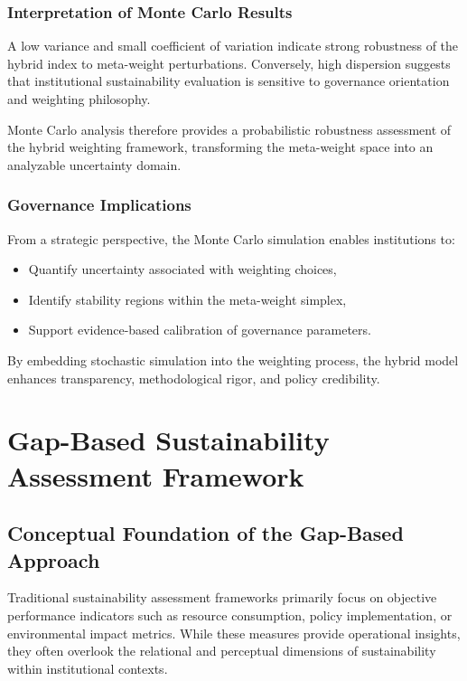\documentclass[11pt,a4paper]{article}
\begin{document}
\subsubsection{Interpretation of Monte Carlo Results}

A low variance and small coefficient of variation indicate strong robustness of the hybrid index to meta-weight perturbations. Conversely, high dispersion suggests that institutional sustainability evaluation is sensitive to governance orientation and weighting philosophy.

Monte Carlo analysis therefore provides a probabilistic robustness assessment of the hybrid weighting framework, transforming the meta-weight space into an analyzable uncertainty domain.

\subsubsection{Governance Implications}

From a strategic perspective, the Monte Carlo simulation enables institutions to:

\begin{itemize}
\item Quantify uncertainty associated with weighting choices,
\item Identify stability regions within the meta-weight simplex,
\item Support evidence-based calibration of governance parameters.
\end{itemize}

By embedding stochastic simulation into the weighting process, the hybrid model enhances transparency, methodological rigor, and policy credibility.


\section{Gap-Based Sustainability Assessment Framework}

\subsection{Conceptual Foundation of the Gap-Based Approach}

Traditional sustainability assessment frameworks primarily focus on 
objective performance indicators such as resource consumption, policy 
implementation, or environmental impact metrics. While these measures 
provide operational insights, they often overlook the relational and 
perceptual dimensions of sustainability within institutional contexts.
\end{document}
